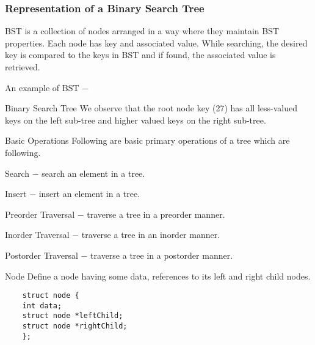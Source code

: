 \documentclass[algocomplexity.tex]{subfiles}
\begin{document}
\begin{frame}
	\frametitle{Representation of a Binary Search Tree}
	\large
	
	BST is a collection of nodes arranged in a way where they maintain BST properties. Each node has key and associated value. While searching, the desired key is compared to the keys in BST and if found, the associated value is retrieved.
	
	An example of BST −
\end{frame}
\begin{frame}
	Binary Search Tree
	We observe that the root node key (27) has all less-valued keys on the left sub-tree and higher valued keys on the right sub-tree.
\end{frame}
\begin{frame}
	Basic Operations
	Following are basic primary operations of a tree which are following.
	
	Search − search an element in a tree.
	
	Insert − insert an element in a tree.
	
	Preorder Traversal − traverse a tree in a preorder manner.
	
	Inorder Traversal − traverse a tree in an inorder manner.
	
	Postorder Traversal − traverse a tree in a postorder manner.
\end{frame}
\begin{frame}[fragile]
	Node
	Define a node having some data, references to its left and right child nodes.
	\begin{verbatim}
	struct node {
	int data;   
	struct node *leftChild;
	struct node *rightChild;
	};
	\end{verbatim}
\end{frame}

	
\end{document}
